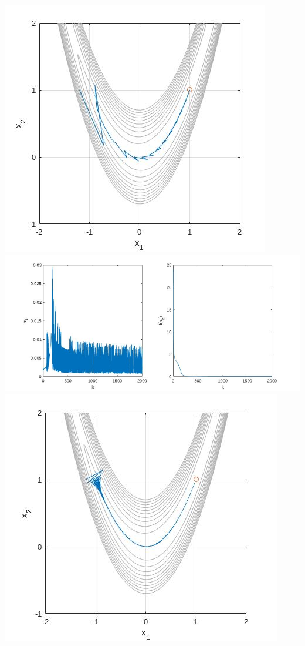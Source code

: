 \documentclass{article}
\begin{document}
\includegraphics[width=\linewidth]{a9_hard_bfgs.jpg}
\includegraphics[width=\linewidth]{a9_hard_sd_a_f.jpg}
\includegraphics[width=\linewidth]{a9_hard_sd.jpg}
\end{document}
